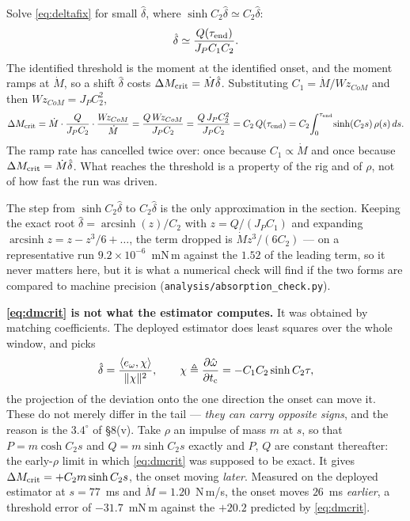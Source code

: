\documentclass[11pt]{article}
\newcommand{\Wz}{W\!z_{CoM}}
\newcommand{\tc}{t_{\rm c}}
\newcommand{\te}{\tau_{\rm end}}
\begin{document}
Solve \eqref{eq:deltafix} for small $\hat\delta$, where
$\sinh C_2\hat\delta \simeq C_2\hat\delta$:
\begin{equation}
  \hat\delta \simeq \frac{Q(\te)}{J_PC_1C_2} .
\end{equation}
The identified threshold is the moment at the identified onset, and the
moment ramps at $\dot M$, so a shift $\hat\delta$ costs
$\Delta M_{\rm crit} = \dot M\hat\delta$. Substituting
$C_1 = \dot M/\Wz$ and then $\Wz = J_PC_2^{2}$,
\begin{equation}
  \Delta M_{\rm crit}
   = \dot M\cdot\frac{Q}{J_PC_2}\cdot\frac{\Wz}{\dot M}
   = \frac{Q\,\Wz}{J_PC_2}
   = \frac{Q\,J_PC_2^{2}}{J_PC_2}
   = C_2\,Q(\te)
   = C_2\!\int_0^{\te}\!\sinh(C_2s)\,\rho(s)\,ds .
  \label{eq:dmcrit}
\end{equation}
The ramp rate has cancelled twice over: once because $C_1\propto\dot M$
and once because $\Delta M_{\rm crit} = \dot M\hat\delta$. What reaches
the threshold is a property of the rig and of $\rho$, not of how fast
the run was driven.

The step from $\sinh C_2\hat\delta$ to $C_2\hat\delta$ is the only
approximation in the section. Keeping the exact root
$\hat\delta = \operatorname{arcsinh}(z)/C_2$ with
$z = Q/(J_PC_1)$ and expanding
$\operatorname{arcsinh}z = z - z^3/6 + \ldots$, the term dropped is
$\dot Mz^3/(6C_2)$ --- on a representative run
$9.2\times10^{-6}$~mN\,m against the $1.52$ of the leading term, so it
never matters here, but it is what a numerical check will find if the
two forms are compared to machine precision
(\texttt{analysis/absorption\_check.py}).

\textbf{\eqref{eq:dmcrit} is not what the estimator computes.} It was
obtained by matching coefficients. The deployed estimator does least
squares over the whole window, and picks
\begin{equation}
  \hat\delta = \frac{\langle e_\omega,\chi\rangle}{\|\chi\|^{2}},
  \qquad
  \chi \triangleq \frac{\partial\hat\omega}{\partial\tc}
      = -C_1C_2\sinh C_2\tau ,
  \label{eq:proj}
\end{equation}
the projection of the deviation onto the one direction the onset can
move it. These do not merely differ in the tail --- \emph{they can carry
opposite signs}, and the reason is the $3.4^\circ$ of \S8(v). Take
$\rho$ an impulse of mass $m$ at $s$, so that $P = m\cosh C_2s$ and
$Q = m\sinh C_2s$ exactly and $P$, $Q$ are constant thereafter: the
early-$\rho$ limit in which \eqref{eq:dmcrit} was supposed to be exact.
It gives $\Delta M_{\rm crit} = +C_2m\sinh C_2s$, the onset moving
\emph{later}. Measured on the deployed estimator at $s = 77$~ms and
$\dot M = 1.20$~N\,m/s, the onset moves $26$~ms \emph{earlier}, a
threshold error of $-31.7$~mN\,m against the $+20.2$ predicted by
\eqref{eq:dmcrit}.
\end{document}
